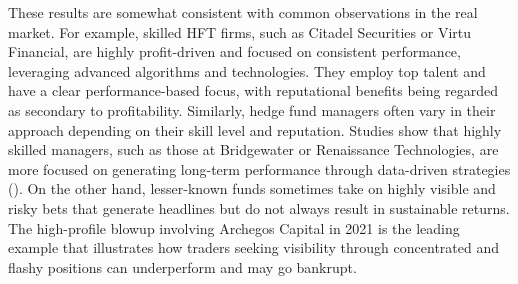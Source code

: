 These results are somewhat consistent with common observations in the real market. For example, skilled HFT firms, such as Citadel Securities or Virtu Financial, are highly profit-driven and focused on consistent performance, leveraging advanced algorithms and technologies. They employ top talent and have a clear performance-based focus, with reputational benefits being regarded as secondary to profitability.
Similarly, hedge fund managers often vary in their approach depending on their skill level and reputation. Studies show that highly skilled managers, such as those at Bridgewater or Renaissance Technologies, are more focused on generating long-term performance through data-driven strategies (\citealp{schwager2012hedge}). On the other hand, lesser-known funds sometimes take on highly visible and risky bets that generate headlines but do not always result in sustainable returns. The high-profile blowup involving Archegos Capital in 2021 is the leading example that illustrates how traders seeking visibility through concentrated and flashy positions can underperform and may go bankrupt.



